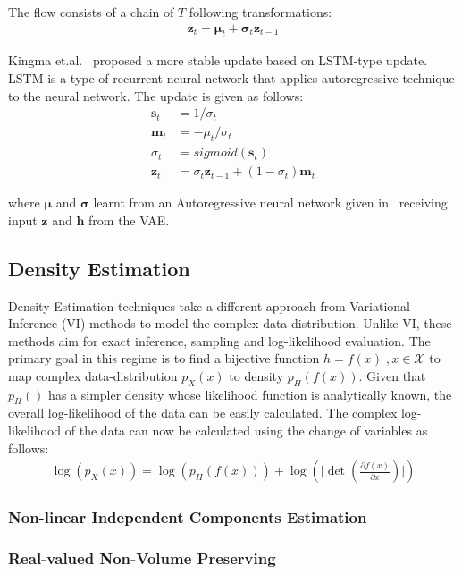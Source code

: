 \documentclass[runningheads]{llncs}
\begin{document}
The flow consists of a chain of $T$ following transformations:
\begin{align}
\mathbf{z}_t = \bm{\mu}_t + \bm{\sigma}_t\mathbf{z}_{t-1}
\end{align}

Kingma et.al.~\cite{kingma2016improved} proposed a more stable update based on LSTM-type update. LSTM is a type of recurrent neural network that applies autoregressive technique to the neural network.  The update is given as follows:
\begin{align}
\mathbf{s}_t &= 1 / \sigma_t\\
\mathbf{m}_t &= -\mu_t / \sigma_t\\
\sigma_t &= sigmoid(\mathbf{s}_t)\\
\mathbf{z}_t &= \sigma_t\mathbf{z}_{t-1} + (1 - \sigma_t)\mathbf{m}_{t} 
\end{align}

where $\bm{\mu}$ and $\bm{\sigma}$ learnt from an Autoregressive neural network given in~\cite{germain2015made} receiving input $\mathbf{z}$ and $\mathbf{h}$ from the VAE. 

\subsection{Density Estimation}
Density Estimation techniques take a different approach from Variational Inference (VI) methods to model the complex data distribution. Unlike VI, these methods aim for exact inference, sampling and log-likelihood evaluation. The primary goal in this regime is to find a bijective function $h=f(x)\;,x \in \mathcal{X}$ to map complex data-distribution $p_X(x)$ to density $p_H(f(x))$. Given that $p_H()$ has a simpler density whose likelihood function is analytically known, the overall log-likelihood of the data can be easily calculated. The complex log-likelihood of the data can now be calculated using the change of variables as follows:
\begin{align}
\log(p_X(x)) = \log(p_H(f(x))) +
\log(\lvert \det(\frac{\partial f(x)}{\partial x}) \rvert)
\end{align}

\subsubsection{Non-linear Independent Components Estimation}
\subsubsection{Real-valued Non-Volume Preserving} \label{sec:realnvp}
\end{document}
